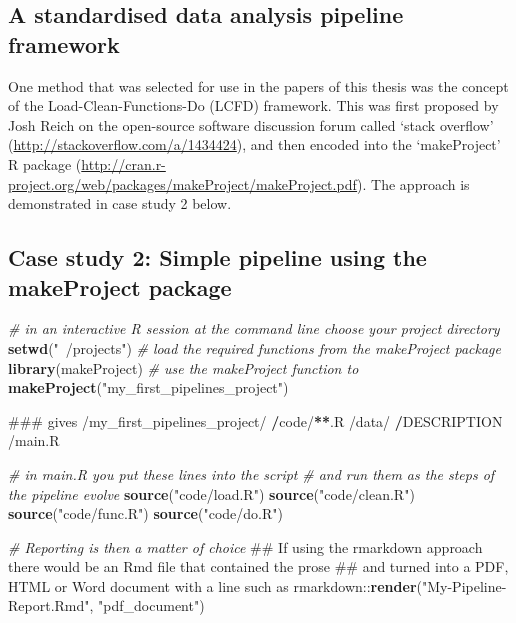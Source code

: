\documentclass[11pt,a4paper]{article}
\newenvironment{Shaded}{\begin{snugshade}}{\end{snugshade}}
\newcommand{\KeywordTok}[1]{\textcolor[rgb]{0.13,0.29,0.53}{\textbf{{#1}}}}
\newcommand{\StringTok}[1]{\textcolor[rgb]{0.31,0.60,0.02}{{#1}}}
\newcommand{\CommentTok}[1]{\textcolor[rgb]{0.56,0.35,0.01}{\textit{{#1}}}}
\newcommand{\ErrorTok}[1]{\textbf{{#1}}}
\newcommand{\NormalTok}[1]{{#1}}
\begin{document}
\subsection{A standardised data analysis pipeline
framework}\label{a-standardised-data-analysis-pipeline-framework}

One method that was selected for use in the papers of this thesis was
the concept of the Load-Clean-Functions-Do (LCFD) framework. This was
first proposed by Josh Reich on the open-source software discussion
forum called `stack overflow'
(\url{http://stackoverflow.com/a/1434424}), and then encoded into the
`makeProject' R package
(\url{http://cran.r-project.org/web/packages/makeProject/makeProject.pdf}).
The approach is demonstrated in case study 2 below.



\subsection{Case study 2: Simple pipeline using the makeProject
package}\label{case-study-2-simple-pipeline-using-the-makeproject-package}

\begin{Shaded}
\begin{Highlighting}[]
\CommentTok{# in an interactive R session at the command line choose your project directory}
\KeywordTok{setwd}\NormalTok{(}\StringTok{"~/projects"}\NormalTok{)   }
\CommentTok{# load the required functions from the makeProject package}
\KeywordTok{library}\NormalTok{(makeProject)}
\CommentTok{# use the makeProject function to }
\KeywordTok{makeProject}\NormalTok{(}\StringTok{"my_first_pipelines_project"}\NormalTok{)}

\NormalTok{### gives}
\NormalTok{/my_first_pipelines_project/}
\StringTok{    }\ErrorTok{/}\NormalTok{code/}\ErrorTok{**}\NormalTok{.R}
    \NormalTok{/data/}
\StringTok{    }\ErrorTok{/}\NormalTok{DESCRIPTION}
    \NormalTok{/main.R}

\CommentTok{# in main.R you put these lines into the script}
\CommentTok{# and run them as the steps of the pipeline evolve}
\KeywordTok{source}\NormalTok{(}\StringTok{"code/load.R"}\NormalTok{)}
\KeywordTok{source}\NormalTok{(}\StringTok{"code/clean.R"}\NormalTok{)}
\KeywordTok{source}\NormalTok{(}\StringTok{"code/func.R"}\NormalTok{)}
\KeywordTok{source}\NormalTok{(}\StringTok{"code/do.R"}\NormalTok{)}

\CommentTok{# Reporting is then a matter of choice}
\NormalTok{## If using the rmarkdown approach there would be an Rmd file that contained the prose}
\NormalTok{## and turned into a PDF, HTML or Word document with a line such as }
\NormalTok{rmarkdown::}\KeywordTok{render}\NormalTok{(}\StringTok{"My-Pipeline-Report.Rmd"}\NormalTok{, }\StringTok{"pdf_document"}\NormalTok{)}
\end{Highlighting}
\end{Shaded}
\end{document}
